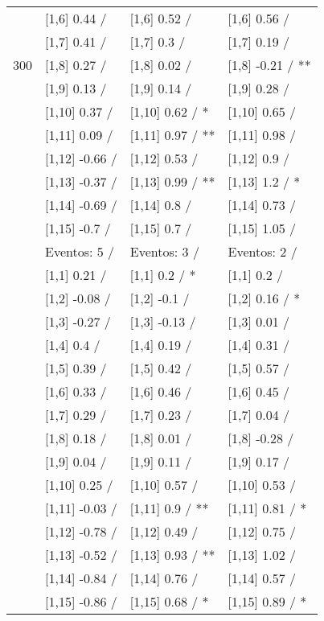 \begin{table}
\begin{tabular}[t]{llll}
 & {}[1,6] 0.44  / & {}[1,6] 0.52  / & {}[1,6] 0.56  /\\
 & {}[1,7] 0.41  / & {}[1,7] 0.3  / & {}[1,7] 0.19  /\\
300 & {}[1,8] 0.27  / & {}[1,8] 0.02  / & {}[1,8] -0.21  / **\\
\addlinespace
 & {}[1,9] 0.13  / & {}[1,9] 0.14  / & {}[1,9] 0.28  /\\
 & {}[1,10] 0.37  / & {}[1,10] 0.62  / * & {}[1,10] 0.65  /\\
 & {}[1,11] 0.09  / & {}[1,11] 0.97  / ** & {}[1,11] 0.98  /\\
 & {}[1,12] -0.66  / & {}[1,12] 0.53  / & {}[1,12] 0.9  /\\
 & {}[1,13] -0.37  / & {}[1,13] 0.99  / ** & {}[1,13] 1.2  / *\\
\addlinespace
 & {}[1,14] -0.69  / & {}[1,14] 0.8  / & {}[1,14] 0.73  /\\
 & {}[1,15] -0.7  / & {}[1,15] 0.7  / & {}[1,15] 1.05  /\\
 & Eventos:  5 / & Eventos:  3 / & Eventos:  2 /\\
 & {}[1,1] 0.21  / & {}[1,1] 0.2  / * & {}[1,1] 0.2  /\\
 & {}[1,2] -0.08  / & {}[1,2] -0.1  / & {}[1,2] 0.16  / *\\
\addlinespace
 & {}[1,3] -0.27  / & {}[1,3] -0.13  / & {}[1,3] 0.01  /\\
 & {}[1,4] 0.4  / & {}[1,4] 0.19  / & {}[1,4] 0.31  /\\
 & {}[1,5] 0.39  / & {}[1,5] 0.42  / & {}[1,5] 0.57  /\\
 & {}[1,6] 0.33  / & {}[1,6] 0.46  / & {}[1,6] 0.45  /\\
 & {}[1,7] 0.29  / & {}[1,7] 0.23  / & {}[1,7] 0.04  /\\
\addlinespace
500 & {}[1,8] 0.18  / & {}[1,8] 0.01  / & {}[1,8] -0.28  /\\
 & {}[1,9] 0.04  / & {}[1,9] 0.11  / & {}[1,9] 0.17  /\\
 & {}[1,10] 0.25  / & {}[1,10] 0.57  / & {}[1,10] 0.53  /\\
 & {}[1,11] -0.03  / & {}[1,11] 0.9  / ** & {}[1,11] 0.81  / *\\
 & {}[1,12] -0.78  / & {}[1,12] 0.49  / & {}[1,12] 0.75  /\\
\addlinespace
 & {}[1,13] -0.52  / & {}[1,13] 0.93  / ** & {}[1,13] 1.02  /\\
 & {}[1,14] -0.84  / & {}[1,14] 0.76  / & {}[1,14] 0.57  /\\
 & {}[1,15] -0.86  / & {}[1,15] 0.68  / * & {}[1,15] 0.89  / *\\
\bottomrule
\end{tabular}
\end{table}
